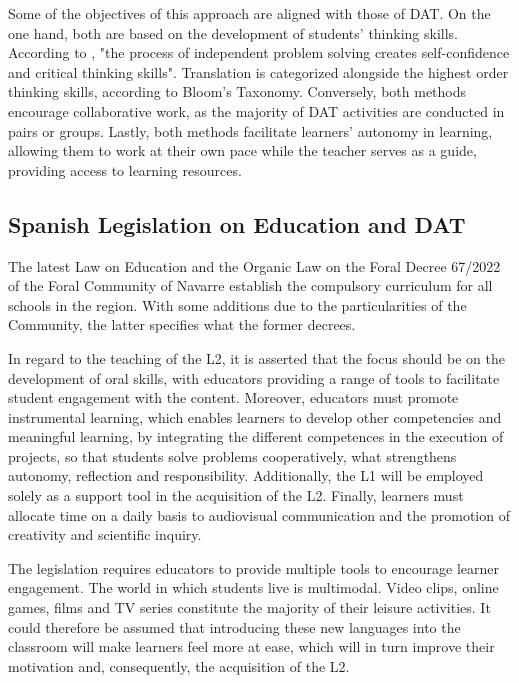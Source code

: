 Some of the objectives of this approach are aligned with those of DAT.
On the one hand, both are based on the development of
students' thinking skills. According to \textcite[p. 214]{ghaffari2017montessori}, "the process of independent
problem solving creates self-confidence and critical thinking skills".
Translation is categorized alongside the highest order thinking skills,
according to Bloom's Taxonomy. Conversely, both methods
encourage collaborative work, as the majority of DAT activities are
conducted in pairs or groups. Lastly, both methods facilitate
learners' autonomy in learning, allowing them to work
at their own pace while the teacher serves as a guide, providing access
to learning resources.

\subsection{Spanish Legislation on Education and DAT}\label{sub-sec-spanishlegislationoneducationanddat}

The latest Law on Education \cite{lomloe2020} and the Organic Law on the
Foral Decree 67/2022 of the Foral Community of Navarre establish the
compulsory curriculum for all schools in the region. With some additions
due to the particularities of the Community, the latter specifies what
the former decrees.

In regard to the teaching of the L2, it is asserted that the focus
should be on the development of oral skills, with educators providing a
range of tools to facilitate student engagement with the content.
Moreover, educators must promote instrumental learning, which enables
learners to develop other competencies and meaningful learning, by
integrating the different competences in the execution of projects, so
that students solve problems cooperatively, what strengthens autonomy,
reflection and responsibility. Additionally, the L1 will be employed
solely as a support tool in the acquisition of the L2. Finally, learners
must allocate time on a daily basis to audiovisual communication and
the promotion of creativity and scientific inquiry.

The legislation requires educators to provide multiple tools to
encourage learner engagement. The world in which students live is
multimodal. Video clips, online games, films and TV series constitute
the majority of their leisure activities. It could therefore be assumed
that introducing these new languages into the classroom will make
learners feel more at ease, which will in turn improve their motivation
and, consequently, the acquisition of the L2.

